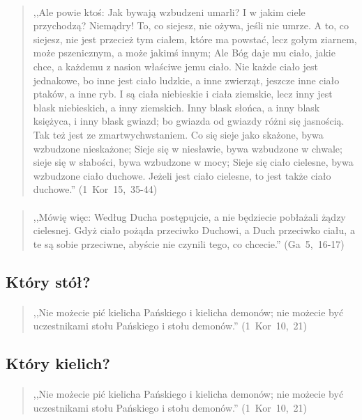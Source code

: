 \documentclass[10pt,a4paper,oneside]{article}
\begin{document}
\paragraph{}
\begin{quote}
,,Ale powie ktoś: Jak bywają wzbudzeni umarli? I w jakim ciele przychodzą? Niemądry! To, co siejesz, nie ożywa, jeśli nie umrze. A to, co siejesz, nie jest przecież tym ciałem, które ma powstać, lecz gołym ziarnem, może pszenicznym, a może jakimś innym; Ale Bóg daje mu ciało, jakie chce, a każdemu z nasion właściwe jemu ciało. Nie każde ciało jest jednakowe, bo inne jest ciało ludzkie, a inne zwierząt, jeszcze inne ciało ptaków, a inne ryb. I są ciała niebieskie i ciała ziemskie, lecz inny jest blask niebieskich, a inny ziemskich. Inny blask słońca, a inny blask księżyca, i inny blask gwiazd; bo gwiazda od gwiazdy różni się jasnością. Tak też jest ze zmartwychwstaniem. Co się sieje jako skażone, bywa wzbudzone nieskażone; Sieje się w niesławie, bywa wzbudzone w chwale; sieje się w słabości, bywa wzbudzone w mocy; Sieje się ciało cielesne, bywa wzbudzone ciało duchowe. Jeżeli jest ciało cielesne, to jest także ciało duchowe.'' \mbox{(1 Kor 15, 35-44)}
\end{quote}
\paragraph{}
\begin{quote}
,,Mówię więc: Według Ducha postępujcie, a nie będziecie pobłażali żądzy cielesnej. Gdyż ciało pożąda przeciwko Duchowi, a Duch przeciwko ciału, a te są sobie przeciwne, abyście nie czynili tego, co chcecie.'' \mbox{(Ga 5, 16-17)}
\end{quote}
\subsection{Który stół?}
\paragraph{}
\begin{quote}
,,Nie możecie pić kielicha Pańskiego i kielicha demonów; nie możecie być uczestnikami stołu Pańskiego i stołu demonów.'' \mbox{(1 Kor 10, 21)}
\end{quote}
\subsection{Który kielich?}
\paragraph{}
\begin{quote}
,,Nie możecie pić kielicha Pańskiego i kielicha demonów; nie możecie być uczestnikami stołu Pańskiego i stołu demonów.'' \mbox{(1 Kor 10, 21)}
\end{quote}
\end{document}
